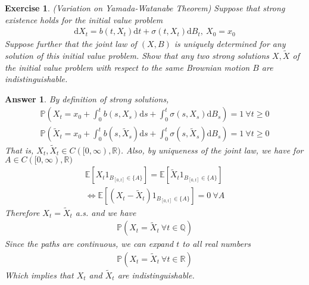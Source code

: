 \documentclass[12pt]{article}
\theoremstyle{colon}
\newtheorem{exercise}{Exercise}
\newtheorem*{answer}{Answer}
\begin{document}
\clearpage

\begin{exercise}
  (Variation on Yamada-Watanabe Theorem) Suppose that strong existence holds for the initial value problem
  \begin{gather*}
    \text{d} X_t = b(t, X_t) \text{d} t + \sigma(t, X_t)\text{d} B_t, \ X_0 = x_0
  \end{gather*}
  Suppose further that the joint law of $(X,B)$ is uniquely determined for any solution of this initial value problem. Show that any two strong solutions $X, \tilde{X}$ of the initial value problem with respect to the same Brownian motion $B$ are indistinguishable.
\end{exercise}

\begin{answer}
  By definition of strong solutions,
  \begin{gather*}
    \mathbb{P}(X_t = x_0 + \int_0^t b(s, X_s) \text{d} s + \int_0^t \sigma(s, X_s)\text{d} B_s) = 1 \ \forall t \geq 0 \\
    \mathbb{P}(\tilde{X}_t = x_0 + \int_0^t b(s, \tilde{X}_s) \text{d} s + \int_0^t \sigma(s, \tilde{X}_s)\text{d} B_s) = 1 \ \forall t \geq 0
  \end{gather*}
  That is, $X_t, \tilde{X}_t \in C([0,\infty), \mathbb{R})$. Also, by uniqueness of the joint law, we have for $A \in C([0,\infty), \mathbb{R})$
  \begin{gather*}
    \mathbb{E}[X_t 1_{B_{[0,t]} \in \{A\}}] = \mathbb{E}[\tilde{X}_t 1_{B_{[0,t]} \in \{A\}}] \\
    \Longleftrightarrow \mathbb{E}[(X_t - \tilde{X}_t) 1_{B_{[0,t]} \in \{A\}}] = 0 \ \forall A
  \end{gather*}
  Therefore $X_t = \tilde{X}_t$ a.s. and we have
  \begin{gather*}
    \mathbb{P}(X_t = \tilde{X}_t \ \forall t \in \mathbb{Q})
  \end{gather*}
  Since the paths are continuous, we can expand $t$ to all real numbers
  \begin{gather*}
    \mathbb{P}(X_t = \tilde{X}_t \ \forall t \in \mathbb{R})
  \end{gather*}
  Which implies that $X_t$ and $\tilde{X}_t$ are indistinguishable.
\end{answer}

\clearpage
\end{document}
